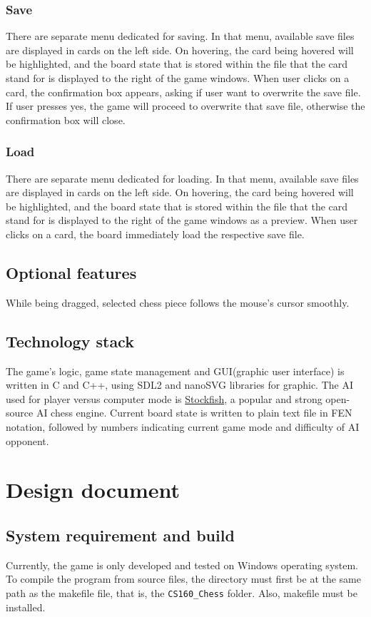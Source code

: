 \documentclass[a4paper, 10pt, titlepage]{report}
\begin{document}
\subsection{Save}
There are separate menu dedicated for saving. In that menu, available save files are displayed in cards on the left side. On hovering, the card being hovered will be highlighted, and the board state that is stored within the file that the card stand for is displayed to the right of the game windows. When user clicks on a card, the confirmation box appears, asking if user want to overwrite the save file. If user presses yes, the game will proceed to overwrite that save file, otherwise the confirmation box will close.

\subsection{Load}
There are separate menu dedicated for loading. In that menu, available save files are displayed in cards on the left side. On hovering, the card being hovered will be highlighted, and the board state that is stored within the file that the card stand for is displayed to the right of the game windows as a preview. When user clicks on a card, the board immediately load the respective save file.
\section{Optional features}
While being dragged, selected chess piece follows the mouse's cursor smoothly.
\section{Technology stack}
The game's logic, game state management and GUI(graphic user interface) is written in C and C++, using SDL2 and nanoSVG libraries for graphic. The AI used for player versus computer mode is \href{https://github.com/official-stockfish/Stockfish}{Stockfish}, a popular and strong open-source AI chess engine. Current board state is written to plain text file in FEN notation, followed by numbers indicating current game mode and difficulty of AI opponent.
\chapter{Design document}
\section{System requirement and build}
Currently, the game is only developed and tested on Windows operating system.
To compile the program from source files, the directory must first be at the same path as the makefile file, that is, the \texttt{CS160\_Chess} folder. Also, makefile must be installed.
\end{document}
